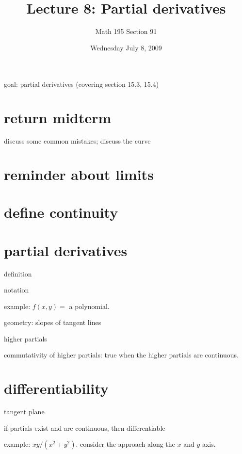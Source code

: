 \documentclass[12pt]{article}
\title{Lecture 8: Partial derivatives}
\author{Math 195 Section 91}
\date{Wednesday July  8, 2009}
\begin{document}
\maketitle

goal: partial derivatives (covering section 15.3, 15.4)

\section{return midterm}

discuss some common mistakes; discuss the curve

\section{reminder about limits}

\section{define continuity}

\section{partial derivatives}

definition

notation

example: $f(x,y) = $ a polynomial.

geometry: slopes of tangent lines

higher partials

commutativity of higher partials: true when the higher partials are continuous.

\section{differentiability}

tangent plane

if partials exist and are continuous, then differentiable

example: $xy/(x^2 + y^2)$.  consider the approach along the $x$ and $y$ axis.
\end{document}
